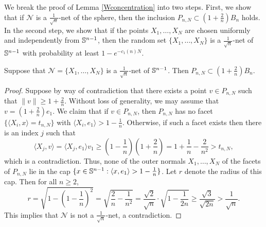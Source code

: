 

We break the proof of Lemma \ref{Wconcentration} into two steps. First, we show that if $\mathcal N$ is a $\frac{1}{\sqrt{n}}$-net of the sphere, then the inclusion $P_{n,N} \subset (1+\frac{2}{n})B_n$ holds. In the second step, we show that if the points $X_1,\ldots, X_N$ are chosen uniformly and independently from $\mathbb{S}^{n-1}$, then the random set $\{X_1,\ldots,X_N\}$ is a $\frac{1}{\sqrt{n}}$-net of $\mathbb{S}^{n-1}$ with probability at least $1-e^{-c_1(n)N}$. 



\begin{lemma}\label{lemma1W}
	Suppose that $\mathcal N=\{X_1,\ldots,X_N\}$ is a $\frac{1}{\sqrt{n}}$-net of $\mathbb{S}^{n-1}$. Then $P_{n,N} \subset (1+\frac{2}{n})B_n$.
\end{lemma}

\begin{proof}
	Suppose by way of contradiction that there exists a point $v\in P_{n,N}$ such that $\|v\| \geq 1+\frac{2}{n}$. Without loss of generality, we may assume that  $v = (1+\frac{2}{n})e_1$. We claim that if $v\in P_{n,N}$, then $P_{n,N}$ has no facet $\{\langle X_i,x\rangle = t_{n,N}\}$ with $\langle X_i, e_1\rangle > 1-\frac{1}{n}$. Otherwise, if such a facet exists then there is an index $j$ such that
	\[
	\langle X_j, v\rangle = \langle X_j, e_1\rangle v_1 
	\geq \left(1-\frac{1}{n}\right)\left(1+\frac{2}{n}\right) = 1+\frac{1}{n}-\frac{2}{n^2} > t_{n,N},
	\]which is a contradiction. Thus, none of the outer normals $X_1,\ldots,X_N$ of the facets of $P_{n,N}$ lie in the cap $ \{x\in\mathbb{S}^{n-1}: \langle x, e_1\rangle > 1-\frac{1}{n}\}$. Let $r$ denote the radius of this cap. Then for all $n\geq 2$,
	\[
	r= \sqrt{1-\left(1-\frac{1}{n}\right)^2} = \sqrt{\frac{2}{n}-\frac{1}{n^2}} = \frac{\sqrt{2}}{\sqrt{n}}\cdot\sqrt{1-\frac{1}{2n}} \geq \frac{\sqrt{3}}{\sqrt{2n}} > \frac{1}{\sqrt{n}}.
	\]
	This implies that $\mathcal N$ is not a $\frac{1}{\sqrt{n}}$-net, a contradiction.
\end{proof}

